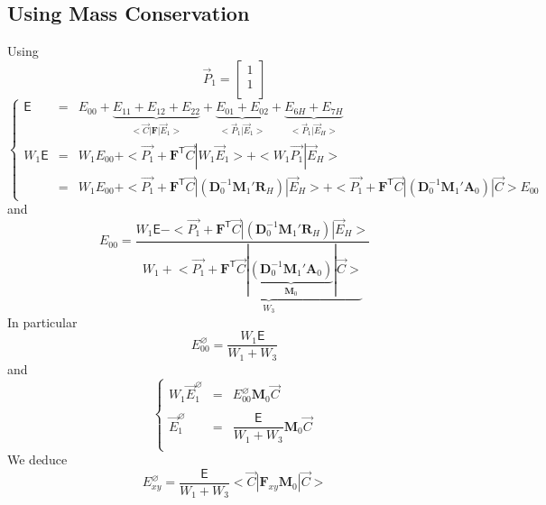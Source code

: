 \documentclass[aps,onecolumn,11pt]{revtex4}
\newcommand{\mytrn}[1]{{#1}^{\!\mathsf{T}}}
\newcommand{\mymat}[1]{{\bm{#1}}}
\begin{document}
\subsection{Using Mass Conservation}
Using $$\vec{P}_1=\begin{bmatrix}1\\1\\\end{bmatrix}$$
\begin{equation}
\left\lbrace
\begin{array}{rcl}
\mathsf{E}    & = & E_{00} 
+ \underbrace{E_{11}+E_{12}+E_{22}}_{<\vec{C}|\mymat{F}|\vec{E}_1>} 
+ \underbrace{E_{01}+E_{02}}_{<\vec{P}_1|\vec{E}_1>} 
+ \underbrace{E_{6H} + E_{7H}}_{<\vec{P}_1|\vec{E}_H>}\\
W_1\mathsf{E} & = & W_1E_{00} + <\vec{P_1} + \mytrn{\mymat{F}} \vec{C} | W_1 \vec{E}_1 > +  < W_1\vec{P_1} | \vec{E}_H>\\
     & = &  W_1E_{00} + <\vec{P_1} + \mytrn{\mymat{F}} \vec{C}| \left( \mymat{D}_0^{-1} \mymat{M}_1' \mymat{R}_H \right) | \vec{E}_H> + 
     <\vec{P_1} + \mytrn{\mymat{F}} \vec{C}| \left( \mymat{D}_0^{-1} \mymat{M}_1' \mymat{A}_0 \right) | \vec{C}> E_{00}
\end{array}
\right.
\end{equation}
and
\begin{equation}
\boxed{
	E_{00} = \dfrac{W_1 \mathsf{E} - <\vec{P_1} + \mytrn{\mymat{F}} \vec{C}| \left( \mymat{D}_0^{-1} \mymat{M}_1' \mymat{R}_H \right) | \vec{E}_H> }
	{ W_1+\underbrace{<\vec{P_1} + \mytrn{\mymat{F}} \vec{C}| \underbrace{\left( \mymat{D}_0^{-1} \mymat{M}_1' \mymat{A}_0 \right)}_{\mymat{M}_0} | \vec{C}>}_{W_3}}
}
\end{equation}
In particular
\begin{equation}
	E_{00}^\varnothing = \dfrac{W_1 \mathsf{E}}{W_1+W_3}
\end{equation}
and
\begin{equation}
\left\lbrace
\begin{array}{rcl}
	W_1 \vec{E}_1^\varnothing & = & E_{00}^\varnothing  \mymat{M}_0 \vec{C}\\
	\\
	\vec{E}_1^\varnothing     & = & \dfrac{\mathsf{E}}{W_1+W_3}\mymat{M}_0 \vec{C}\\
\end{array}
\right.
\end{equation}
We deduce
\begin{equation}
	E_{xy}^\varnothing = \dfrac{\mathsf{E}}{W_1+W_3} <\vec{C}|\mymat{F}_{xy}\mymat{M}_0|\vec{C}>
\end{equation}
\end{document}
